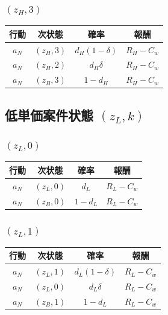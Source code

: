 \documentclass[11pt,a4paper]{bxjsarticle}
\begin{document}
\subsubsection*{\((z_H,3)\)}
\begin{table}[H]
\centering
\begin{tabular}{cccc}
\toprule
行動 & 次状態 & 確率 & 報酬 \\
\midrule
\(a_N\) & \((z_H,3)\) & \(d_H(1-\delta)\) & \(R_H-C_w\) \\
\(a_N\) & \((z_H,2)\) & \(d_H\delta\) & \(R_H-C_w\) \\
\(a_N\) & \((z_B,3)\) & \(1-d_H\) & \(R_H-C_w\) \\
\bottomrule
\end{tabular}
\end{table}

\subsection{低単価案件状態 \((z_L,k)\)}

\subsubsection*{\((z_L,0)\)}
\begin{table}[H]
\centering
\begin{tabular}{cccc}
\toprule
行動 & 次状態 & 確率 & 報酬 \\
\midrule
\(a_N\) & \((z_L,0)\) & \(d_L\) & \(R_L-C_w\) \\
\(a_N\) & \((z_B,0)\) & \(1-d_L\) & \(R_L-C_w\) \\
\bottomrule
\end{tabular}
\end{table}

\subsubsection*{\((z_L,1)\)}
\begin{table}[H]
\centering
\begin{tabular}{cccc}
\toprule
行動 & 次状態 & 確率 & 報酬 \\
\midrule
\(a_N\) & \((z_L,1)\) & \(d_L(1-\delta)\) & \(R_L-C_w\) \\
\(a_N\) & \((z_L,0)\) & \(d_L\delta\) & \(R_L-C_w\) \\
\(a_N\) & \((z_B,1)\) & \(1-d_L\) & \(R_L-C_w\) \\
\bottomrule
\end{tabular}
\end{table}
\end{document}
